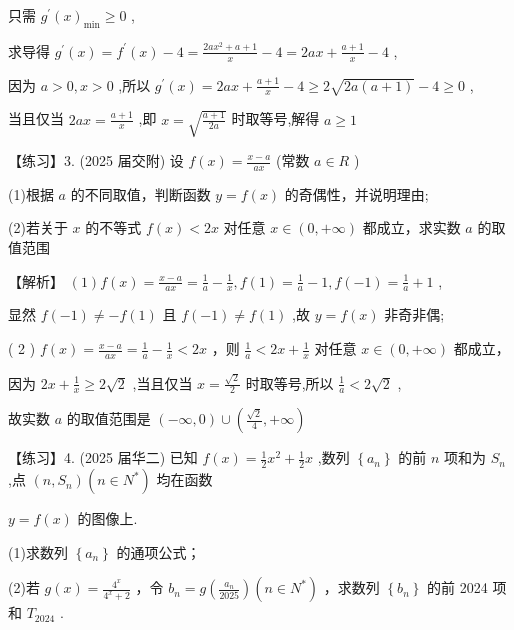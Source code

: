 \documentclass[10pt]{article}
\begin{document}
只需 \({g}^{\prime }{\left( x\right) }_{\min } \geq  0\) ,

求导得 \({g}^{\prime }\left( x\right)  = {f}^{\prime }\left( x\right)  - 4 = \frac{{2a}{x}^{2} + a + 1}{x} - 4 = {2ax} + \frac{a + 1}{x} - 4\) ,

因为 \(a > 0,x > 0\) ,所以 \({g}^{\prime }\left( x\right)  = {2ax} + \frac{a + 1}{x} - 4 \geq  2\sqrt{{2a}\left( {a + 1}\right) } - 4 \geq  0\) ,

当且仅当 \({2ax} = \frac{a + 1}{x}\) ,即 \(x = \sqrt{\frac{a + 1}{2a}}\) 时取等号,解得 \(a \geq  1\)

【练习】3. (2025 届交附) 设 \(f\left( x\right)  = \frac{x - a}{ax}\) (常数 \(a \in  R\) )

(1)根据 \(a\) 的不同取值，判断函数 \(y = f\left( x\right)\) 的奇偶性，并说明理由;

(2)若关于 \(x\) 的不等式 \(f\left( x\right)  < {2x}\) 对任意 \(x \in  \left( {0, + \infty }\right)\) 都成立，求实数 \(a\) 的取值范围

【解析】 \(\left( 1\right) f\left( x\right)  = \frac{x - a}{ax} = \frac{1}{a} - \frac{1}{x},f\left( 1\right)  = \frac{1}{a} - 1,f\left( {-1}\right)  = \frac{1}{a} + 1\) ,

显然 \(f\left( {-1}\right)  \neq   - f\left( 1\right)\) 且 \(f\left( {-1}\right)  \neq  f\left( 1\right)\) ,故 \(y = f\left( x\right)\) 非奇非偶;

( 2 ) \(f\left( x\right)  = \frac{x - a}{ax} = \frac{1}{a} - \frac{1}{x} < {2x}\) ，则 \(\frac{1}{a} < {2x} + \frac{1}{x}\) 对任意 \(x \in  \left( {0, + \infty }\right)\) 都成立，

因为 \({2x} + \frac{1}{x} \geq  2\sqrt{2}\) ,当且仅当 \(x = \frac{\sqrt{2}}{2}\) 时取等号,所以 \(\frac{1}{a} < 2\sqrt{2}\) ,

故实数 \(a\) 的取值范围是 \(\left( {-\infty ,0}\right)  \cup  \left( {\frac{\sqrt{2}}{4}, + \infty }\right)\)

【练习】4. (2025 届华二) 已知 \(f\left( x\right)  = \frac{1}{2}{x}^{2} + \frac{1}{2}x\) ,数列 \(\left\{  {a}_{n}\right\}\) 的前 \(n\) 项和为 \({S}_{n}\) ,点 \(\left( {n,{S}_{n}}\right) \left( {n \in  {N}^{ * }}\right)\) 均在函数

\(y = f\left( x\right)\) 的图像上.

(1)求数列 \(\left\{  {a}_{n}\right\}\) 的通项公式；

(2)若 \(g\left( x\right)  = \frac{{4}^{x}}{{4}^{x} + 2}\) ，令 \({b}_{n} = g\left( \frac{{a}_{n}}{2025}\right) \left( {n \in  {N}^{ * }}\right)\) ，求数列 \(\left\{  {b}_{n}\right\}\) 的前 2024 项和 \({T}_{2024}\) .
\end{document}
